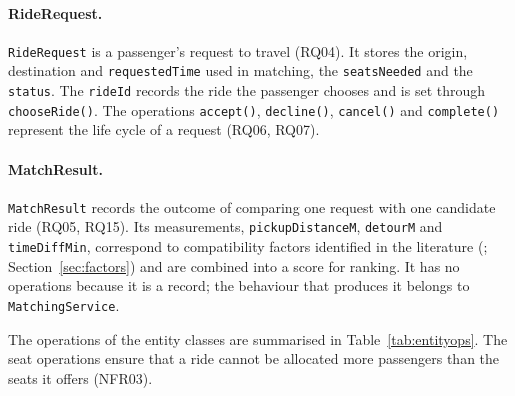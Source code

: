 {\paragraph{RideRequest.} \texttt{RideRequest} is a passenger's request to travel (RQ04). It stores the origin, destination and \texttt{requestedTime} used in matching, the \texttt{seatsNeeded} and the \texttt{status}. The \texttt{rideId} records the ride the passenger chooses and is set through \texttt{chooseRide()}. The operations \texttt{accept()}, \texttt{decline()}, \texttt{cancel()} and \texttt{complete()} represent the life cycle of a request (RQ06, RQ07).

\paragraph{MatchResult.} \texttt{MatchResult} records the outcome of comparing one request with one candidate ride (RQ05, RQ15). Its measurements, \texttt{pickupDistanceM}, \texttt{detourM} and \texttt{timeDiffMin}, correspond to compatibility factors identified in the literature (\citealp{stiglic2016}; Section~\ref{sec:factors}) and are combined into a score for ranking. It has no operations because it is a record; the behaviour that produces it belongs to \texttt{MatchingService}.

The operations of the entity classes are summarised in Table~\ref{tab:entityops}. The seat operations ensure that a ride cannot be allocated more passengers than the seats it offers (NFR03).

}
